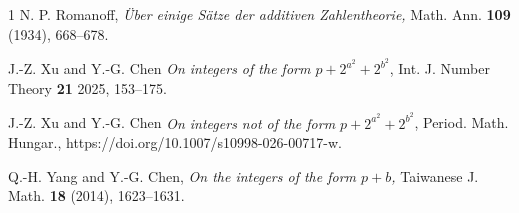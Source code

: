 \documentclass[12pt,a4paper,reqno]{amsart}
\numberwithin{equation}{section}
\theoremstyle{plain}
\theoremstyle{definition}
\begin{document}
\begin{thebibliography}{1}
N. P. Romanoff, {\it \"Uber einige S\"atze der additiven Zahlentheorie,} Math. Ann. {\bf 109} (1934), 668--678.

J.-Z. Xu and Y.-G. Chen {\it On integers of the form $p+2^{a^2}+2^{b^2}$}, Int. J. Number Theory {\bf 21} 2025, 153--175.

J.-Z. Xu and Y.-G. Chen {\it On integers not of the form $p+2^{a^2}+2^{b^2}$},  Period. Math. Hungar., https://doi.org/10.1007/s10998-026-00717-w.

Q.-H. Yang and Y.-G. Chen, {\it On the integers of the form $p+b$,} Taiwanese J. Math.
{\bf18} (2014), 1623--1631.

\end{thebibliography}
\end{document}
